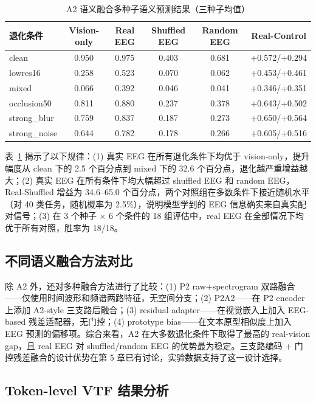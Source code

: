 \begin{table}[htbp]
  \centering
  \caption{A2 语义融合多种子语义预测结果（三种子均值）}
  \label{tab:a2-main}
  \begin{tabular}{l c c c c c}
    \toprule
    退化条件 & Vision-only & Real EEG & Shuffled EEG & Random EEG & Real-Control \\
    \midrule
    clean & 0.950 & 0.975 & 0.403 & 0.681 & +0.572/+0.294 \\
    lowres16 & 0.258 & 0.523 & 0.070 & 0.062 & +0.453/+0.461 \\
    mixed & 0.066 & 0.392 & 0.046 & 0.041 & +0.346/+0.351 \\
    occlusion50 & 0.811 & 0.880 & 0.237 & 0.378 & +0.643/+0.502 \\
    strong\_blur & 0.759 & 0.837 & 0.187 & 0.273 & +0.650/+0.564 \\
    strong\_noise & 0.644 & 0.782 & 0.178 & 0.266 & +0.605/+0.516 \\
    \bottomrule
  \end{tabular}
\end{table}

表~\ref{tab:a2-main} 揭示了以下规律：(1) 真实 EEG 在所有退化条件下均优于 vision-only，提升幅度从 clean 下的 2.5 个百分点到 mixed 下的 32.6 个百分点，退化越严重增益越大；(2) 真实 EEG 在所有条件下均大幅超过 shuffled EEG 和 random EEG，Real-Shuffled 增益为 34.6--65.0 个百分点，两个对照组在多数条件下接近随机水平（对 40 类任务，随机概率为 2.5\%），说明模型学到的 EEG 信息确实来自真实配对信号；(3) 在 3 个种子 × 6 个条件的 18 组评估中，real EEG 在全部情况下均优于所有对照，胜率为 18/18。


\subsection{不同语义融合方法对比}

除 A2 外，还对多种融合方法进行了比较：(1) P2 raw+spectrogram 双路融合——仅使用时间波形和频谱两路特征，无空间分支；(2) P2A2——在 P2 encoder 上添加 A2-style 三支路后融合；(3) residual adapter——在视觉嵌入上加入 EEG-based 残差适配器，无门控；(4) prototype bias——在文本原型相似度上加入 EEG 预测的偏移项。综合来看，A2 在大多数退化条件下取得了最高的 real-vision gap，且 real EEG 对 shuffled/random EEG 的优势最为稳定。三支路编码 + 门控残差融合的设计优势在第 5 章已有讨论，实验数据支持了这一设计选择。

\subsection{Token-level VTF 结果分析}

